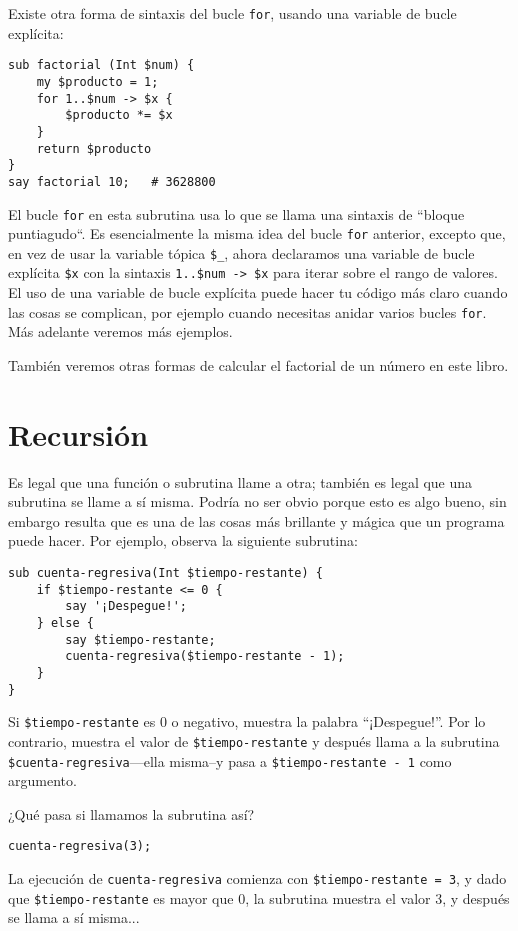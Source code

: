 Existe otra forma de sintaxis del bucle {\tt for}, usando una variable
de bucle explícita:

\begin{verbatim}
sub factorial (Int $num) { 
    my $producto = 1;  
    for 1..$num -> $x { 
        $producto *= $x
    }
    return $producto
}
say factorial 10;   # 3628800
\end{verbatim} 

El bucle {\tt for} en esta subrutina usa lo que se llama una
sintaxis de ``bloque puntiagudo``. Es esencialmente la misma
idea del bucle {\tt for} anterior, excepto que, en vez de usar
la variable tópica \verb|$_|, ahora declaramos una variable de
bucle explícita \verb|$x| con la sintaxis \verb|1..$num -> $x|
para iterar sobre el rango de valores. El uso de una variable de
bucle explícita puede hacer tu código más claro cuando las cosas
se complican, por ejemplo cuando necesitas anidar varios bucles
{\tt for}. Más adelante veremos más ejemplos.

También veremos otras formas de calcular el factorial de un
número en este libro.

\section{Recursión}
\label{recursion}

Es legal que una función o subrutina llame a otra; también 
es legal que una subrutina se llame a sí misma. Podría no ser
obvio porque esto es algo bueno, sin embargo resulta que es una 
de las cosas más brillante y mágica que un programa puede hacer.
Por ejemplo, observa la siguiente subrutina:

\begin{verbatim}
sub cuenta-regresiva(Int $tiempo-restante) {
    if $tiempo-restante <= 0 {
        say '¡Despegue!';
    } else {
        say $tiempo-restante;
        cuenta-regresiva($tiempo-restante - 1);
    }
}
\end{verbatim}
%
Si {\tt \$tiempo-restante} es 0 o negativo, muestra
la palabra ``¡Despegue!''. Por lo contrario, muestra el valor de 
{\tt \$tiempo-restante} y después llama a la subrutina 
{\tt \$cuenta-regresiva}---ella misma--y pasa a
{\tt \$tiempo-restante - 1} como argumento.

¿Qué pasa si llamamos la subrutina así?

\begin{verbatim}
cuenta-regresiva(3);
\end{verbatim}
%
La ejecución de {\tt cuenta-regresiva} comienza con 
{\tt \$tiempo-restante = 3}, y dado que {\tt \$tiempo-restante}
es mayor que 0, la subrutina muestra el valor 3, y después
se llama a sí misma...

